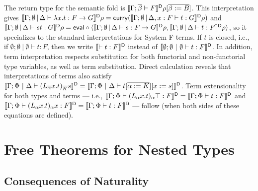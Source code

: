\documentclass[runningheads]{llncs}
\begin{document}
The return type for the semantic fold is $\llbracket{\Gamma;\overline{\beta} \vdash
  F}\rrbracket^{\mathsf D}\rho[\overline{\beta := B}]$.  This interpretation gives
$\llbracket{\Gamma;\emptyset \,|\, \Delta \vdash \lambda x.t : F \to G}\rrbracket^{\mathsf D}\rho
= \mathsf{curry} (\llbracket{\Gamma;\emptyset \,|\, \Delta, x : F \vdash t :
  G}\rrbracket^{\mathsf D}\rho)$ and $\llbracket{\Gamma;\emptyset \,|\, \Delta \vdash st: G}\rrbracket^{\mathsf D} \rho
= \mathsf{eval} \circ \langle \llbracket{\Gamma;\emptyset \,|\, \Delta \vdash s: F
  \to G}\rrbracket^{\mathsf D}\rho, \llbracket{\Gamma;\emptyset \,|\, \Delta \vdash t: F}\rrbracket^{\mathsf D}\rho
\rangle$, so it specializes to the standard interpretations for System
F terms.  If $t$ is closed, i.e., if $\emptyset; \emptyset~|~\emptyset
\vdash t : F$, then we write $\llbracket{\vdash t : F}\rrbracket^{\mathsf D}$ instead of
$\llbracket{\emptyset; \emptyset~|~\emptyset \vdash t : F}\rrbracket^{\mathsf D}$.  In addition,
term interpretation respects substitution for both functorial and
non-functorial type variables, as well as term substitution.  Direct
calculation reveals that interpretations of terms also satisfy
$\llbracket{\Gamma; \Phi~|~\Delta \vdash
  (L_{\overline{\alpha}}x.t)_{\overline{K}}s}\rrbracket^{\mathsf D} = \llbracket{\Gamma;
  \Phi~|~\Delta \vdash t [\overline{\alpha := K}][x := s]}\rrbracket^{\mathsf D}$.
Term extensionality for both types and terms --- i.e.,
$\llbracket{\Gamma;\Phi\vdash (L_\alpha x.t)_\alpha \top : F}\rrbracket^{\mathsf D} =
\llbracket{\Gamma;\Phi \vdash t : F}\rrbracket^{\mathsf D}$ and
$\llbracket{\Gamma;\Phi\vdash (L_\alpha x.t)_\alpha x : F}\rrbracket^{\mathsf D} =
\llbracket{\Gamma;\Phi \vdash t : F}\rrbracket^{\mathsf D}$ --- follow (when both
sides of these equations are defined).

\vspace*{-0.15in}

\section{Free Theorems for Nested Types}\label{sec:ftnt}

\vspace*{-0.1in}

\subsection{Consequences of Naturality}\label{sec:Nat-type-terms}   
\end{document}
